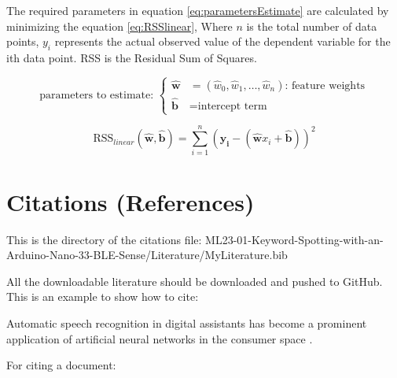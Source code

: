 The required parameters in equation \ref{eq:parametersEstimate} are calculated by minimizing the equation \ref{eq:RSSlinear}, Where $n$ is the total number of data points, $y_i$ represents the actual observed value of the dependent variable for the ith data point. RSS is the Residual Sum of Squares.

\begin{equation}\label{eq:parametersEstimate}
	\text{parameters to estimate: }
	\left\{
	\begin{aligned}
		\boldsymbol{\hat{w}} & = (\hat{w}_0, \hat{w}_1, \ldots, \hat{w}_n) \text{: feature weights}\\
		\boldsymbol{\hat{b}} & = \text{intercept term}
	\end{aligned}
	\right.
\end{equation}

\begin{equation}\label{eq:RSSlinear}
	\text{RSS}_{linear} (\boldsymbol{\hat{w}}, \boldsymbol{\hat{b}}) = \sum_{i=1}^{n} (\boldsymbol{y_i} - (\boldsymbol{\hat{w}} x_i + \boldsymbol{\hat{b}}))^2
\end{equation}


\section{Citations (References)}

This is the directory of the citations file: ML23-01-Keyword-Spotting-with-an-Arduino-Nano-33-BLE-Sense/Literature/MyLiterature.bib

All the downloadable literature should be downloaded and pushed to GitHub. This is an example to show how to cite:

Automatic speech recognition in digital assistants has become a prominent application of artificial neural networks in the consumer space \cite{Bushur:2023}.

For citing a document:


